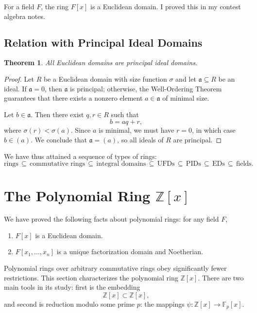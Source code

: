\documentclass[11pt]{article}
\newtheorem{theorem}{Theorem}
\begin{document}
For a field $F$, the ring $F[x]$ is a Euclidean domain. I proved this in my contest algebra notes.


\subsection{Relation with Principal Ideal Domains}

\begin{adjustwidth}{0.5cm}{}
  \begin{theorem}
    All Euclidean domains are principal ideal domains.
  \end{theorem}
  \begin{proof}
    Let $R$ be a Euclidean domain with size function $\sigma$ and let $\mathfrak{a} \subseteq R$ be an ideal. If $\mathfrak{a} = 0$, then $\mathfrak{a}$ is principal; otherwise, the Well-Ordering Theorem guarantees that there exists a nonzero element $a \in \mathfrak{a}$ of minimal size.

    Let $b \in \mathfrak{a}$. Then there exist $q, r \in R$ such that
    \[
      b = aq + r,
    \]
    where $\sigma(r) < \sigma(a)$. Since $a$ is minimal, we must have $r = 0$, in which case $b \in (a)$. We conclude that $\mathfrak{a} = (a)$, so all ideals of $R$ are principal.
  \end{proof}
\end{adjustwidth}

We have thus attained a sequence of types of rings:
\[
  \text{rings} \, \subseteq \, \text{commutative rings} \, \subseteq \, \text{integral domains} \, \subseteq \, \text{UFDs} \, \subseteq \, \text{PIDs} \, \subseteq \, \text{EDs} \, \subseteq \, \text{fields}.
\]


\section{The Polynomial Ring \texorpdfstring{$\mathbb{Z}[x]$}{Z[x]}}

We have proved the following facts about polynomial rings: for any field $F$,
\begin{enumerate}
  \item $F[x]$ is a Euclidean domain.
  \item $F[x_{1}, \ldots, x_{n}]$ is a unique factorization domain and Noetherian.
\end{enumerate}
Polynomial rings over arbitrary commutative rings obey significantly fewer restrictions. This section characterizes the polynomial ring $\mathbb{Z}[x]$. There are two main tools in its study: first is the embedding
\[
  \mathbb{Z}[x] \subset \mathbb{Z}[x],
\]
and second is reduction modulo some prime $p$: the mappings $\psi : \mathbb{Z}[x] \to \mathbb{F}_{p}[x]$.
\end{document}
